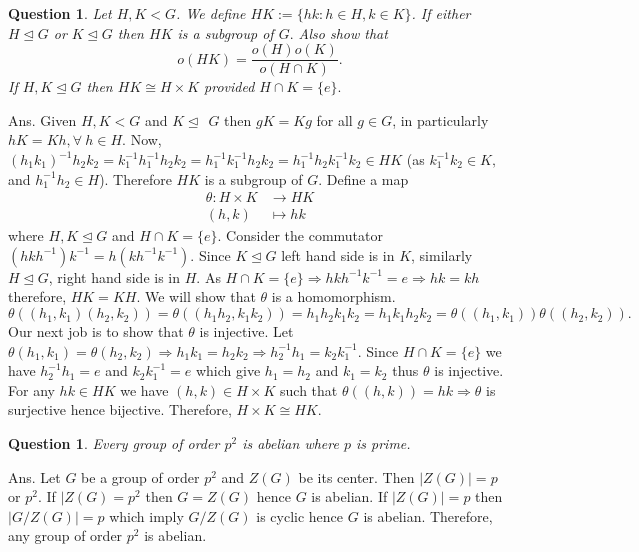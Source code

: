 \documentclass[11pt]{amsart}
\newtheorem{qns}[theorem]{Question}
\begin{document}
\begin{qns}
Let $H,K<G$. We define $HK:=\{hk:h\in H,k\in K\}$. If either $H\unlhd G$ or $K\unlhd G$ then $HK$ is a subgroup of $G.$ Also show that $$o(HK)=\dfrac{o(H)o(K)}{o(H\cap K)}.$$ If $H,K\unlhd G$ then $HK\cong H\times K$ provided $H\cap K=\{e\}.$
\end{qns}
Ans. Given $H,K<G$ and $K\unlhd ~~G$ then $gK=Kg$ for all $g\in G$, in particularly $hK=Kh,\forall~h\in H.$ Now, $(h_1k_1)^{-1}h_2k_2=k_1^{-1}h_1^{-1}h_2k_2=h_1^{-1}k_1^{-1}h_2k_2=h_1^{-1}h_2k_1^{-1}k_2 \in HK$ (as $k_1^{-1}k_2\in K,$ and $h_1^{-1}h_2\in H$). Therefore $HK$ is a subgroup of $G$. Define a map \begin{align*}
\theta: H\times K&\to HK\\
(h,k)&\mapsto hk
\end{align*}
where $H,K\unlhd G$ and $H\cap K=\{e\}.$ Consider the commutator $(hkh^{-1})k^{-1}=h(kh^{-1}k^{-1}).$ Since $K\unlhd G$ left hand side is in $K$, similarly $H\unlhd G$, right hand side is in $H$. As $H\cap K=\{e\} \Rightarrow hkh^{-1}k^{-1}=e \Rightarrow hk=kh$ therefore, $HK=KH.$  We will show that $\theta$ is a homomorphism. $\theta((h_1,k_1)(h_2,k_2))=\theta((h_1h_2,k_1k_2))=h_1h_2k_1k_2=h_1k_1h_2k_2=\theta((h_1,k_1))\theta((h_2,k_2)).$ Our next job is to show that $\theta$ is injective. Let $\theta(h_1,k_1)=\theta(h_2,k_2)\Rightarrow h_1k_1=h_2k_2 \Rightarrow h_2^{-1}h_1=k_2k_1^{-1}.$ Since $H\cap K=\{e\}$ we have $h_2^{-1}h_1=e$ and $k_2k_1^{-1}=e$ which give $h_1=h_2$ and $k_1=k_2$ thus $\theta$ is injective. For any $hk\in HK$ we have $(h,k)\in H\times K$ such that $\theta((h,k))=hk \Rightarrow\theta$ is surjective hence bijective. Therefore, $H\times K\cong HK.$ 

\begin{qns}
Every group of order $p^2$ is abelian where $p$ is prime.
\end{qns}
Ans. Let $G$ be a group of order $p^2$ and $Z(G)$ be its center. Then $|Z(G)|=p$ or $p^2$. If $|Z(G)=p^2$ then $G=Z(G)$ hence $G$ is abelian. If $|Z(G)|=p$ then $|G/Z(G)|=p$ which imply $G/Z(G)$ is cyclic hence $G$ is abelian. Therefore, any group of order $p^2$ is abelian.
\end{document}
